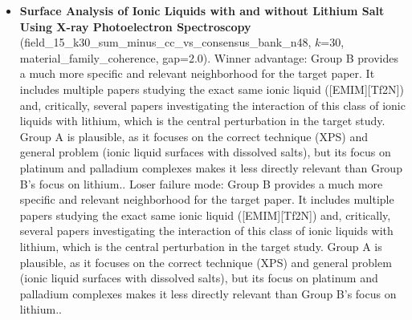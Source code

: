 \begin{itemize}
\item \textbf{Surface Analysis of Ionic Liquids with and without Lithium Salt Using X-ray Photoelectron Spectroscopy} (field\_15\_k30\_sum\_minus\_cc\_vs\_consensus\_bank\_n48, $k$=30, material\_family\_coherence, gap=2.0). Winner advantage: Group B provides a much more specific and relevant neighborhood for the target paper. It includes multiple papers studying the exact same ionic liquid ([EMIM][Tf2N]) and, critically, several papers investigating the interaction of this class of ionic liquids with lithium, which is the central perturbation in the target study. Group A is plausible, as it focuses on the correct technique (XPS) and general problem (ionic liquid surfaces with dissolved salts), but its focus on platinum and palladium complexes makes it less directly relevant than Group B's focus on lithium.. Loser failure mode: Group B provides a much more specific and relevant neighborhood for the target paper. It includes multiple papers studying the exact same ionic liquid ([EMIM][Tf2N]) and, critically, several papers investigating the interaction of this class of ionic liquids with lithium, which is the central perturbation in the target study. Group A is plausible, as it focuses on the correct technique (XPS) and general problem (ionic liquid surfaces with dissolved salts), but its focus on platinum and palladium complexes makes it less directly relevant than Group B's focus on lithium..
\end{itemize}

